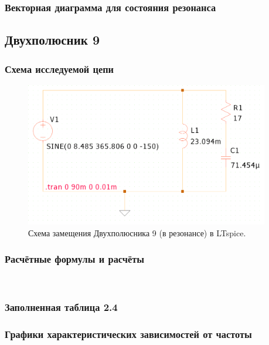 \subsubsection{Векторная диаграмма для состояния резонанса}




\subsection{Двухполюсник 9}

\subsubsection{Схема исследуемой цепи}
\begin{figure}[H]
	\centering
	\includegraphics[width=0.95\textwidth]{./data/schema2_p2}
	\caption{Схема замещения Двухполюсника 9 (в резонансе) в LTspice.}
\end{figure}

\subsubsection{Расчётные формулы и расчёты}


\vspace*{1cm} \\

\subsubsection{Заполненная таблица 2.4}


\subsubsection{Графики характеристических зависимостей от частоты}

